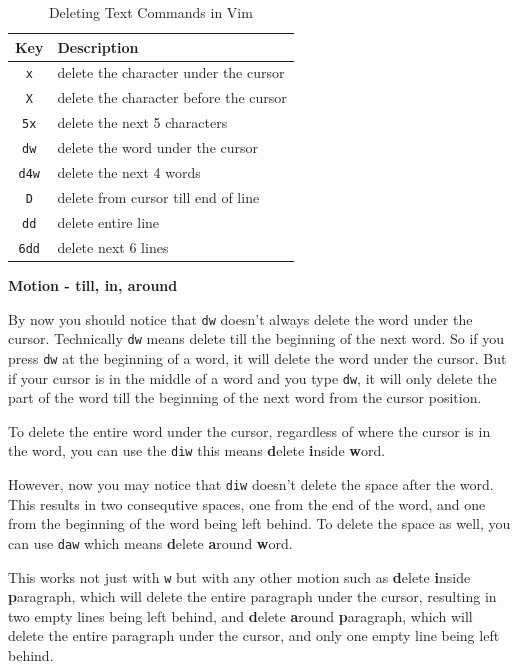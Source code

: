 \begin{table}[h!]
  \caption{Deleting Text Commands in Vim}
  \begin{tabular}{c l}
    \toprule
    Key & Description \\
    \midrule
    \texttt{x} & delete the character under the cursor \\
    \texttt{X} & delete the character before the cursor \\
    \texttt{5x} & delete the next 5 characters \\
    \texttt{dw} & delete the word under the cursor \\
    \texttt{d4w} & delete the next 4 words \\
    \texttt{D} & delete from cursor till end of line \\
    \texttt{dd} & delete entire line \\
    \texttt{6dd} & delete next 6 lines \\
    \bottomrule
  \end{tabular}
\end{table}

\textbf{Motion - till, in, around}

By now you should notice that \texttt{dw} doesn't always
delete the word under the cursor. Technically \texttt{dw}
means delete till the beginning of the next word.
So if you press \texttt{dw} at the beginning of a word,
it will delete the word under the cursor. But if your
cursor is in the middle of a word and you type \texttt{dw},
it will only delete the part of the word till the beginning
of the next word from the cursor position.

To delete the entire word under the cursor, regardless of
where the cursor is in the word, you can use the \texttt{diw}
this means \textbf{d}elete \textbf{i}nside \textbf{w}ord.

However, now you may notice that \texttt{diw} doesn't delete
the space after the word. This results in two consequtive spaces,
one from the end of the word, and one from the beginning of the
word being left behind. To delete the space as well, you can use
\texttt{daw} which means \textbf{d}elete \textbf{a}round \textbf{w}ord.

This works not just with \texttt{w} but with any other motion
such as \textbf{d}elete \textbf{i}nside \textbf{p}aragraph,
which will delete the entire paragraph under the cursor,
resulting in two empty lines being left behind,
and \textbf{d}elete \textbf{a}round \textbf{p}aragraph,
which will delete the entire paragraph under the cursor,
and only one empty line being left behind.

